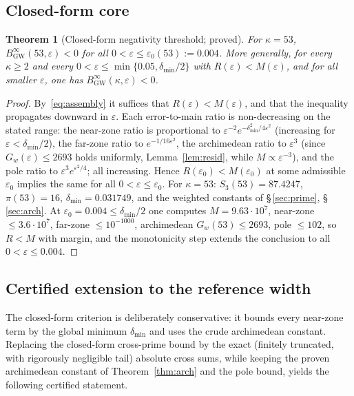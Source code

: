 \documentclass[11pt]{article}
\newtheorem{theorem}{Theorem}[section]
\newcommand{\BinfGW}{B_{\mathrm{GW}}^{\infty}}   %
\newcommand{\dmin}{\delta_{\min}}           %
\begin{document}
\subsection{Closed-form core}

\begin{theorem}[Closed-form negativity threshold; proved]
\label{thm:closedform}
For $\kappa=53$, $\BinfGW(53,\varepsilon)<0$ for all
$0<\varepsilon\le\varepsilon_0(53):=0.004$.
More generally, for every $\kappa\ge 2$ and every
$0<\varepsilon\le\min\{0.05,\dmin/2\}$ with $R(\varepsilon)<M(\varepsilon)$,
and for all smaller $\varepsilon$, one has $\BinfGW(\kappa,\varepsilon)<0$.
\end{theorem}

\begin{proof}
By~\eqref{eq:assembly} it suffices that $R(\varepsilon)<M(\varepsilon)$, and
that the inequality propagates downward in $\varepsilon$.
Each error-to-main ratio is non-decreasing on the stated range: the
near-zone ratio is proportional to
$\varepsilon^{-2}e^{-\dmin^2/4\varepsilon^2}$ (increasing for
$\varepsilon<\dmin/2$), the far-zone ratio to $e^{-1/16\varepsilon^2}$, the
archimedean ratio to $\varepsilon^3$ (since $G_w(\varepsilon)\le 2693$
holds uniformly, Lemma~\ref{lem:resid}, while $M\propto\varepsilon^{-3}$), and the pole ratio to
$\varepsilon^3 e^{\varepsilon^2/4}$; all increasing.
Hence $R(\varepsilon_0)<M(\varepsilon_0)$ at some admissible $\varepsilon_0$
implies the same for all $0<\varepsilon\le\varepsilon_0$.
For $\kappa=53$: $S_3(53)=87.4247$, $\pi(53)=16$, $\dmin=0.031749$, and the
weighted constants of \S\,\ref{sec:prime}, \S\,\ref{sec:arch}.
At $\varepsilon_0=0.004\le\dmin/2$ one computes $M=9.63\cdot10^{7}$,
near-zone $\le 3.6\cdot10^{7}$, far-zone $\le 10^{-1000}$, archimedean
$G_w(53)\le 2693$, pole $\le 102$, so $R<M$ with margin, and the
monotonicity step extends the conclusion to all $0<\varepsilon\le 0.004$.
\end{proof}

\subsection{Certified extension to the reference width}

The closed-form criterion is deliberately conservative: it bounds every
near-zone term by the global minimum $\dmin$ and uses the crude archimedean
constant.
Replacing the closed-form cross-prime bound by the exact (finitely
truncated, with rigorously negligible tail) absolute cross sums, while
keeping the proven archimedean constant of Theorem~\ref{thm:arch} and the
pole bound, yields the following certified statement.
\end{document}
